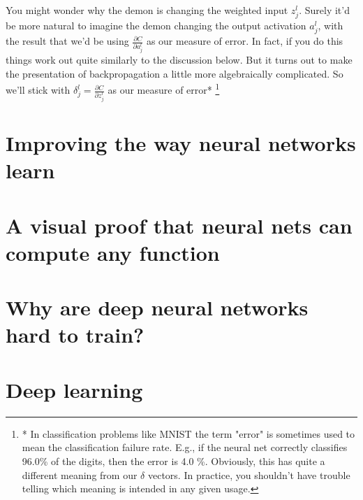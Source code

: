 \documentclass[a4paper,12pt]{report}%
\begin{document}
You might wonder why the demon is changing the weighted input $z_{j}^{l}$. Surely it'd be more natural to imagine the demon changing the output activation $a_{j}^{l}$, with the result that we'd be using $\frac{\partial C}{\partial a_{j}^{l}}$ as our measure of error. In fact, if you do this things work out quite similarly to the discussion below. But it turns out to make the presentation of backpropagation a little more algebraically complicated. So we'll stick with $\delta_{j}^{l} = \frac {\partial C}{\partial z_{j}^{l}}$ as our measure of error* \footnote{* \color{blue} In classification problems like MNIST the term "error" is sometimes used to mean the classification failure rate. E.g., if the neural net correctly classifies 96.0\%  of the digits, then the error is 4.0 \%. Obviously, this has quite a different meaning from our $\delta$ vectors. In practice, you shouldn't have trouble telling which meaning is intended in any given usage.}


%



\chapter{\color{IAF} \bf Improving the way neural networks learn}




\chapter{\color{IAF} \bf A visual proof that neural nets can compute any function}



\chapter{\color{IAF} \bf Why are deep neural networks hard to train?}



\chapter{\color{IAF} \bf Deep learning}
\end{document}
